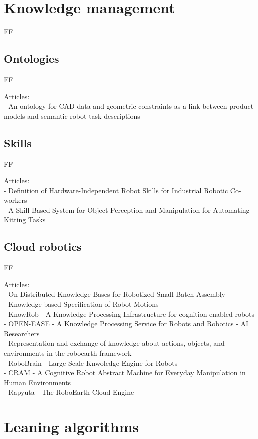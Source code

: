 \section{Knowledge management}

FF

\subsection{Ontologies}

FF

Articles:\\
- An ontology for CAD data and geometric constraints as a link between product models and semantic robot task descriptions


\subsection{Skills}

FF

Articles:\\
- Definition of Hardware-Independent Robot Skills for Industrial Robotic Co-workers\\
- A Skill-Based System for Object Perception and Manipulation for Automating Kitting Tasks


\subsection{Cloud robotics}

FF

Articles:\\
- On Distributed Knowledge Bases for Robotized Small-Batch Assembly\\
- Knowledge-based Specification of Robot Motions\\
- KnowRob - A Knowledge Processing Infrastructure for cognition-enabled robots\\
- OPEN-EASE - A Knowledge Processing Service for Robots and Robotics - AI Researchers\\
- Representation and exchange of knowledge about actions, objects, and environments in the roboearth framework\\
- RoboBrain - Large-Scale Knwoledge Engine for Robots\\
- CRAM - A Cognitive Robot Abstract Machine for Everyday Manipulation in Human Environments\\
- Rapyuta - The RoboEarth Cloud Engine


\section{Leaning algorithms}

